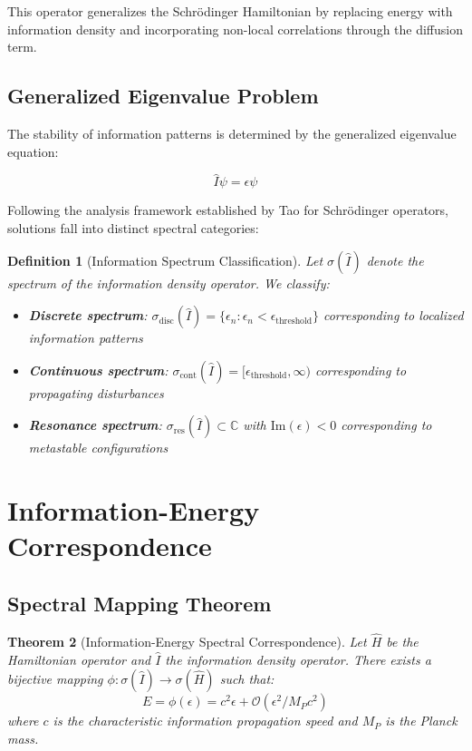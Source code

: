 \documentclass[12pt]{article}
\newtheorem{theorem}{Theorem}[section]
\newtheorem{definition}[theorem]{Definition}
\begin{document}
This operator generalizes the Schrödinger Hamiltonian by replacing energy with information density and incorporating non-local correlations through the diffusion term.

\subsection{Generalized Eigenvalue Problem}

The stability of information patterns is determined by the generalized eigenvalue equation:

\begin{equation}
\hat{I}\psi = \epsilon \psi
\end{equation}

Following the analysis framework established by Tao for Schrödinger operators, solutions fall into distinct spectral categories:

\begin{definition}[Information Spectrum Classification]
Let $\sigma(\hat{I})$ denote the spectrum of the information density operator. We classify:
\begin{itemize}
\item \textbf{Discrete spectrum}: $\sigma_{\text{disc}}(\hat{I}) = \{\epsilon_n : \epsilon_n < \epsilon_{\text{threshold}}\}$ corresponding to localized information patterns
\item \textbf{Continuous spectrum}: $\sigma_{\text{cont}}(\hat{I}) = [\epsilon_{\text{threshold}}, \infty)$ corresponding to propagating disturbances
\item \textbf{Resonance spectrum}: $\sigma_{\text{res}}(\hat{I}) \subset \mathbb{C}$ with $\text{Im}(\epsilon) < 0$ corresponding to metastable configurations
\end{itemize}
\end{definition}

\section{Information-Energy Correspondence}

\subsection{Spectral Mapping Theorem}

\begin{theorem}[Information-Energy Spectral Correspondence]
Let $\hat{H}$ be the Hamiltonian operator and $\hat{I}$ the information density operator. There exists a bijective mapping $\phi: \sigma(\hat{I}) \to \sigma(\hat{H})$ such that:
\begin{equation}
E = \phi(\epsilon) = c^2 \epsilon + \mathcal{O}(\epsilon^2/M_P c^2)
\end{equation}
where $c$ is the characteristic information propagation speed and $M_P$ is the Planck mass.
\end{theorem}
\end{document}
